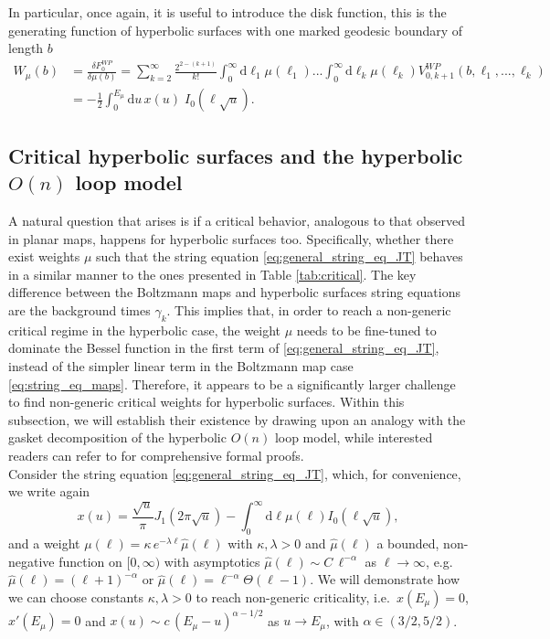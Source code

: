 \documentclass[a4paper,11pt]{article}
\newcommand{\rmd}{\mathrm{d}}
\begin{document}
In particular, once again, it is useful to introduce the disk function, this is the generating function of hyperbolic surfaces with one marked geodesic boundary of length $b$
\begin{align}
W_\mu(b) &=\frac{\delta F^{WP}
_0}{\delta\mu(b)}=\sum_{k=2}^\infty\frac{2^{2-(k+1)}}{k!}\int_0^\infty \rmd \ell_1
\mu(\ell_1)...\int_0^\infty \rmd \ell_k
\mu(\ell_k)V^{WP}_{0,k+1}(b,\ell_1,...,\ell_k)\\
   &= -\frac{1}{2}\int_{0}^{E_\mu} \!\!\!\rmd u\, x(u)\;I_0(\ell\sqrt{u}).\label{eq:JT_disk_function}
\end{align}
\subsection{Critical hyperbolic surfaces and the hyperbolic $O(n)$ loop model}
A natural question that arises is if a critical behavior, analogous to that observed in planar maps, happens for hyperbolic surfaces too. Specifically, whether there exist weights $\mu$ such that the string equation \eqref{eq:general_string_eq_JT} behaves in a similar manner to the ones presented in Table \ref{tab:critical}. The key difference between the Boltzmann maps and hyperbolic surfaces string equations are the background times $\gamma_k$. This implies that, in order to reach a non-generic critical regime in the hyperbolic case, the weight $\mu$ needs to be fine-tuned to dominate the Bessel function in the first term of \eqref{eq:general_string_eq_JT}, instead of the simpler linear term in the Boltzmann map case \eqref{eq:string_eq_maps}. Therefore, it appears to be a significantly larger challenge to find non-generic critical weights for hyperbolic surfaces. Within this subsection, we will establish their existence by drawing upon an analogy with the gasket decomposition of the hyperbolic $O(n)$ loop model, while interested readers can refer to \cite{budd2023} for comprehensive formal proofs.\\
Consider the string equation \eqref{eq:general_string_eq_JT}, which, for convenience, we write again 
\begin{equation*}
 x(u)=\frac{\sqrt{u}}{\pi}J_1\left(2\pi\sqrt{u}\right)-\int_0^\infty \rmd\ell \mu(\ell) I_0\left(\ell \sqrt{u}\right),    
\end{equation*}
and a weight $\mu(\ell) = \kappa \,e^{-\lambda\ell} \hat{\mu}(\ell)$ with $\kappa,\lambda>0$ and $\hat{\mu}(\ell)$ a bounded, non-negative function on $[0,\infty)$ with asymptotics $\hat{\mu}(\ell) \sim C \,\ell^{-\alpha}$ as $\ell\to\infty$, e.g.\ $\hat{\mu}(\ell) = (\ell+1)^{-\alpha}$ or $\hat{\mu}(\ell) = \ell^{-\alpha} \Theta(\ell-1)$. We will demonstrate how we can choose constants $\kappa,\lambda>0$ to reach non-generic criticality, i.e.\ $x(E_\mu)=0$, $x'(E_\mu)=0$ and $x(u) \sim c\, (E_\mu-u)^{\alpha-1/2}$ as $u\to E_\mu$, with $\alpha \in (3/2,5/2)$.
\end{document}
